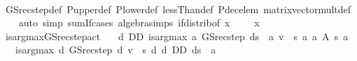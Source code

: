 \begin{isabellebody}
%
\isadelimproof
\ \ %
\endisadelimproof
%
\isatagproof
{}\isamarkupfalse%
\ GS{\isacharunderscore}{\kern0pt}rec{\isacharunderscore}{\kern0pt}step{\isacharunderscore}{\kern0pt}def\ P{\isacharunderscore}{\kern0pt}upper{\isacharunderscore}{\kern0pt}def\ P{\isacharunderscore}{\kern0pt}lower{\isacharunderscore}{\kern0pt}def\ lessThan{\isacharunderscore}{\kern0pt}def\ P{\isacharunderscore}{\kern0pt}dec{\isacharunderscore}{\kern0pt}elem\ matrix{\isacharunderscore}{\kern0pt}vector{\isacharunderscore}{\kern0pt}mult{\isacharunderscore}{\kern0pt}def\isanewline
\ \ \isamarkupfalse%
\ {\isacharparenleft}{\kern0pt}auto\ simp{\isacharcolon}{\kern0pt}\ sum{\isachardot}{\kern0pt}If{\isacharunderscore}{\kern0pt}cases\ algebra{\isacharunderscore}{\kern0pt}simps\ if{\isacharunderscore}{\kern0pt}distrib{\isacharbrackleft}{\kern0pt}of\ {\isachardoublequoteopen}{\isasymlambda}x{\isachardot}{\kern0pt}\ {\isacharunderscore}{\kern0pt}\ {\isachardollar}{\kern0pt}\ {\isacharunderscore}{\kern0pt}\ {\isacharasterisk}{\kern0pt}\ x{\isachardoublequoteclose}{\isacharbrackright}{\kern0pt}{\isacharparenright}{\kern0pt}%
\endisatagproof
{\isafoldproof}%
%
\isadelimproof
\isanewline
%
\endisadelimproof
\isanewline
{}\isamarkupfalse%
\ is{\isacharunderscore}{\kern0pt}arg{\isacharunderscore}{\kern0pt}max{\isacharunderscore}{\kern0pt}GS{\isacharunderscore}{\kern0pt}rec{\isacharunderscore}{\kern0pt}step{\isacharunderscore}{\kern0pt}act{\isacharcolon}{\kern0pt}\isanewline
\ \ \ {\isachardoublequoteopen}d\ {\isasymin}D\isactrlsub D{\isachardoublequoteclose}\ {\isachardoublequoteopen}is{\isacharunderscore}{\kern0pt}arg{\isacharunderscore}{\kern0pt}max\ {\isacharparenleft}{\kern0pt}{\isasymlambda}a{\isachardot}{\kern0pt}\ GS{\isacharunderscore}{\kern0pt}rec{\isacharunderscore}{\kern0pt}step\ {\isacharparenleft}{\kern0pt}d{\isacharprime}{\kern0pt}{\isacharparenleft}{\kern0pt}s\ {\isacharcolon}{\kern0pt}{\isacharequal}{\kern0pt}\ a{\isacharparenright}{\kern0pt}{\isacharparenright}{\kern0pt}\ v\ {\isachardollar}{\kern0pt}\ s{\isacharparenright}{\kern0pt}\ {\isacharparenleft}{\kern0pt}{\isasymlambda}a{\isachardot}{\kern0pt}\ a\ {\isasymin}A\ s{\isacharparenright}{\kern0pt}\ a{\isachardoublequoteclose}\ \isanewline
\ \ \ {\isachardoublequoteopen}is{\isacharunderscore}{\kern0pt}arg{\isacharunderscore}{\kern0pt}max\ {\isacharparenleft}{\kern0pt}{\isasymlambda}d{\isachardot}{\kern0pt}\ GS{\isacharunderscore}{\kern0pt}rec{\isacharunderscore}{\kern0pt}step\ d\ v\ {\isachardollar}{\kern0pt}\ s{\isacharparenright}{\kern0pt}\ {\isacharparenleft}{\kern0pt}{\isasymlambda}d{\isachardot}{\kern0pt}\ d\ {\isasymin}D\isactrlsub D{\isacharparenright}{\kern0pt}\ {\isacharparenleft}{\kern0pt}d{\isacharparenleft}{\kern0pt}s\ {\isacharcolon}{\kern0pt}{\isacharequal}{\kern0pt}\ a{\isacharparenright}{\kern0pt}{\isacharparenright}{\kern0pt}{\isachardoublequoteclose}\isanewline

\end{isabellebody}
